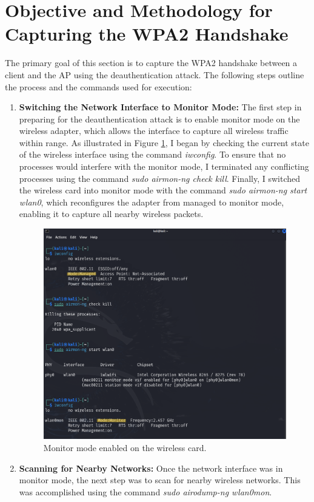 \section{Objective and Methodology for Capturing the WPA2 Handshake}
The primary goal of this section is to capture the WPA2 handshake between a client and the AP using the deauthentication attack. The following steps outline the process and the commands used for execution:

\begin{enumerate}
    \item \textbf{Switching the Network Interface to Monitor Mode:} The first step in preparing for the deauthentication attack is to enable monitor mode on the wireless adapter, which allows the interface to capture all wireless traffic within range. As illustrated in Figure \ref{fig:wlanmon}, I began by checking the current state of the wireless interface using the command \textit{iwconfig}. To ensure that no processes would interfere with the monitor mode, I terminated any conflicting processes using the command \textit{sudo airmon-ng check kill}. Finally, I switched the wireless card into monitor mode with the command \textit{sudo airmon-ng start wlan0}, which reconfigures the adapter from managed to monitor mode, enabling it to capture all nearby wireless packets.

    \begin{figure}[h!]
        \centering
        \includegraphics[width=0.8\linewidth]{images/wlanmon.png}
        \caption{Monitor mode enabled on the wireless card.}
        \label{fig:wlanmon}
    \end{figure}

    \item \textbf{Scanning for Nearby Networks:} Once the network interface was in monitor mode, the next step was to scan for nearby wireless networks. This was accomplished using the command \textit{sudo airodump-ng wlan0mon}.


\end{enumerate}
